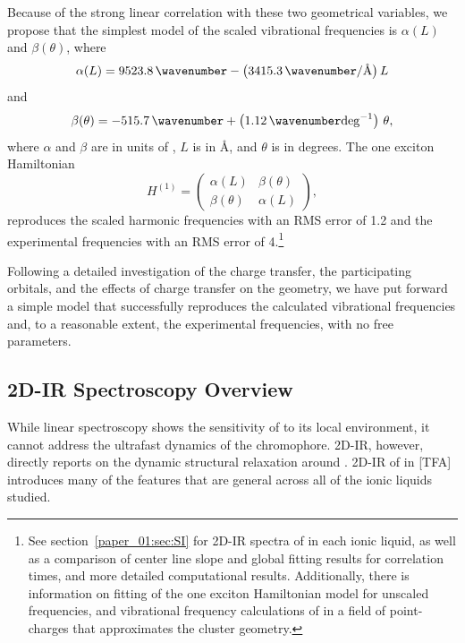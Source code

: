 \documentclass[%
  class = book,%
  crop = false,%
  float = true,%
  multi = true,%
  preview = false,%
]{standalone}
\begin{document}
{Because of the strong linear correlation with these two geometrical variables, we propose that the simplest model of the scaled vibrational frequencies is \(\alpha(L)\) and \(\beta(\theta)\), where
\begin{equation}
  \alpha(L) = \SI{9523.8}{\wavenumber} - \left(\SI{3415.3}{\wavenumber\per\angstrom}\right) L %
\end{equation}
and
\begin{equation}
  \beta(\theta) = \SI{-515.7}{\wavenumber} + \left(\SI{1.12}{\wavenumber}\mathrm{deg}^{-1}\right)\, \theta, %
\end{equation}
where \(\alpha\) and \(\beta\) are in units of \si{\wavenumber}, \(L\) is in \si{\angstrom}, and \(\theta\) is in degrees. The one exciton Hamiltonian
\begin{equation}
  H^{(1)} =
  \begin{pmatrix}
    \alpha(L) & \beta(\theta)\\
    \beta(\theta) & \alpha(L)
  \end{pmatrix},
\end{equation}
reproduces the scaled harmonic frequencies with an RMS error of \SI{1.2}{\wavenumber} and the experimental frequencies with an RMS error of \SI{4}{\wavenumber}.\footnote{See section~\ref{paper_01:sec:SI} for 2D-IR spectra of  in each ionic liquid, as well as a comparison of center line slope and global fitting results for correlation times, and more detailed computational results. Additionally, there is information on fitting of the one exciton Hamiltonian model for unscaled frequencies, and vibrational frequency calculations of  in a field of point-charges that approximates the cluster geometry.}

Following a detailed investigation of the charge transfer, the participating orbitals, and the effects of charge transfer on the  geometry, we have put forward a simple model that successfully reproduces the calculated vibrational frequencies and, to a reasonable extent, the experimental frequencies, with no free parameters.

\subsection{2D-IR Spectroscopy Overview}
\label{sec:anions_2DIR}

While linear spectroscopy shows the sensitivity of  to its local environment, it cannot address the ultrafast dynamics of the chromophore. 2D-IR, however, directly reports on the dynamic structural relaxation around . 2D-IR of  in \ce{[Im_{4,1}]}[TFA] introduces many of the features that are general across all of the ionic liquids studied.

}
\end{document}
